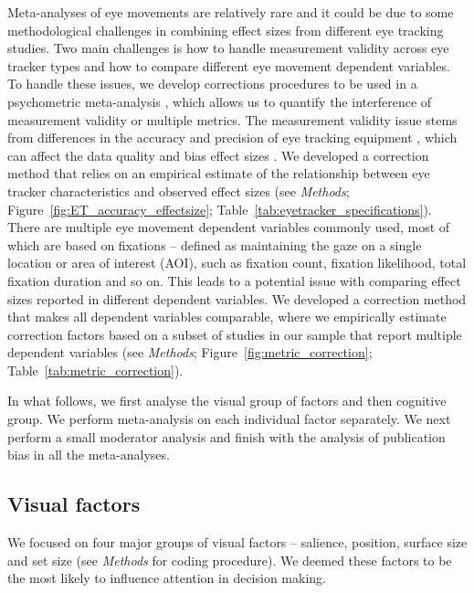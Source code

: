 \documentclass[english,natbib,man,floatsintext]{apa6}
\begin{document}
Meta-analyses of eye movements are relatively rare and it could be due to some methodological challenges in combining effect sizes from different eye tracking studies. Two main challenges is how to handle measurement validity across eye tracker types and how to compare different eye movement dependent variables. To handle these issues, we develop corrections procedures to be used in a psychometric meta-analysis \citep{hunter2004a}, which allows us to quantify the interference of measurement validity or multiple metrics. The measurement validity issue stems from differences in the accuracy and precision of eye tracking equipment \citep{holmqvist2015a}, which can affect the data quality and bias effect sizes \citep{orquin2016a}. We developed a correction method that relies on an empirical estimate of the relationship between eye tracker characteristics and observed effect sizes (see \textit{Methods}; Figure~\ref{fig:ET_accuracy_effectsize}; Table~\ref{tab:eyetracker_specifications}). There are multiple eye movement dependent variables commonly used, most of which are based on fixations -- defined as maintaining the gaze on a single location or area of interest (AOI), such as fixation count, fixation likelihood, total fixation duration and so on. This leads to a potential issue with comparing effect sizes reported in different dependent variables. We developed a correction method that makes all dependent variables comparable, where we empirically estimate correction factors based on a subset of studies in our sample that report multiple dependent variables (see \textit{Methods}; Figure~\ref{fig:metric_correction}; Table~\ref{tab:metric_correction}). 

In what follows, we first analyse the visual group of factors and then cognitive group. We perform meta-analysis on each individual factor  separately. We next perform a small moderator analysis and finish with the analysis of publication bias in all the meta-analyses.  


\subsection{Visual factors}

We focused on four major groups of visual factors -- salience, position, surface size and set size (see \textit{Methods} for coding procedure). We deemed these factors to be the most likely to influence attention in decision making.
\end{document}
